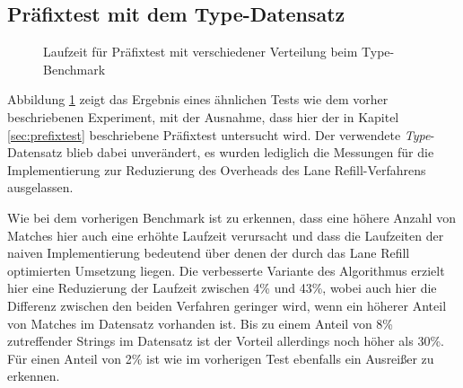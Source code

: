 \subsection{Präfixtest mit dem Type-Datensatz}

\begin{figure}[]
	\centering
	\caption{Laufzeit für Präfixtest mit verschiedener Verteilung beim Type-Benchmark}
\label{fig:type_prefix}
\end{figure}

Abbildung \ref{fig:type_prefix} zeigt das Ergebnis eines ähnlichen Tests wie dem vorher beschriebenen Experiment, mit der Ausnahme, dass hier der in Kapitel \ref{sec:prefixtest} beschriebene Präfixtest untersucht wird.
Der verwendete \emph{Type}-Datensatz blieb dabei unverändert, es wurden lediglich die Messungen für die Implementierung zur Reduzierung des Overheads des Lane Refill-Verfahrens ausgelassen.

Wie bei dem vorherigen Benchmark ist zu erkennen, dass eine höhere Anzahl von Matches hier auch eine erhöhte Laufzeit verursacht und dass die Laufzeiten der naiven Implementierung bedeutend über denen der durch das Lane Refill optimierten Umsetzung liegen.
Die verbesserte Variante des Algorithmus erzielt hier eine Reduzierung der Laufzeit zwischen 4\% und 43\%, wobei auch hier die Differenz zwischen den beiden Verfahren geringer wird, wenn ein höherer Anteil von Matches im Datensatz vorhanden ist.
Bis zu einem Anteil von 8\% zutreffender Strings im Datensatz ist der Vorteil allerdings noch höher als 30\%.
Für einen Anteil von 2\% ist wie im vorherigen Test ebenfalls ein Ausreißer zu erkennen.

